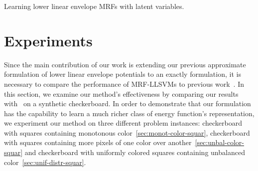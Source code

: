 \begin{algorithm}[hb]
  \begin{algorithmic}[1]
    \REPEAT
    \ENDFOR

    \REPEAT


    \ENDIF
    \ENDFOR

  \end{algorithmic}
  \caption{\label{alg:learning} Learning lower linear envelope
    MRFs with latent variables.}
\end{algorithm}

\section{Experiments}
\label{sec:synth-check}

Since the main contribution of our work is extending our previous
approximate formulation of lower linear envelope potentials to an
exactly formulation, it is necessary to compare the performance
of MRF-LLSVMs to previous work~\cite{gouldlearning}. In this
section, we examine our method's effectiveness by comparing our
results with~\cite{gouldlearning,Gould:ICML2011} on a synthetic
checkerboard. In order to demonstrate that our formulation has
the capability to learn a much richer class of energy function's
representation, we experiment our method on three different
problem instances: checkerboard with squares containing
monotonous color~\ref{sec:monot-color-squar}, checkerboard with
squares containing more pixels of one color over
another~\ref{sec:unbal-color-squar} and checkerboard with
uniformly colored squares containing unbalanced
color~\ref{sec:unif-distr-squar}.


